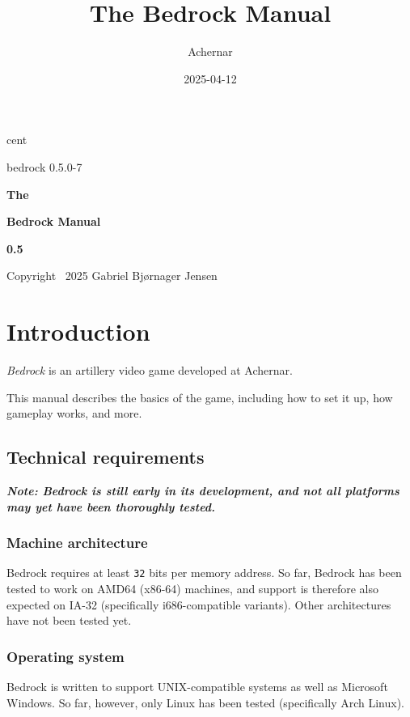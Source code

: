 \documentclass[a5paper, twoside]{report}
\author{Achernar}
\title{The Bedrock Manual}
\date{2025-04-12}
\begin{document}
	\thispagestyle{empty}
	cent

	\begin{center}
		{\small\ttfamily bedrock 0.5.0-7}

		\vspace*{\fill}
		{\large\bfseries The}

		{\huge\bfseries Bedrock Manual}

		{\large\bfseries 0.5}

		\vspace*{\fill}
		{\small Copyright \textcopyright\ 2025 Gabriel Bjørnager Jensen}
	\end{center}

	\clearpage
	\tableofcontents
		\label{content}

	\clearpage
	\chapter{Introduction}
		\label{intro}
		\textit{Bedrock} is an artillery video game developed at Achernar.

		This manual describes the basics of the game, including how to set it up, how gameplay works, and more.

		\section{Technical requirements}
			\begin{mdframed}
				\small\itshape\bfseries
				Note: Bedrock is still early in its development, and not all platforms may yet have been thoroughly tested.
			\end{mdframed}

			\subsection{Machine architecture}
				Bedrock requires at least \texttt{32} bits per memory address.
				So far, Bedrock has been tested to work on AMD64 (x86-64) machines, and support is therefore also expected on IA-32 (specifically i686-compatible variants).
				Other architectures have not been tested yet.

			\subsection{Operating system}
				Bedrock is written to support UNIX-compatible systems as well as Microsoft Windows.
				So far, however, only Linux has been tested (specifically Arch Linux).
\end{document}
